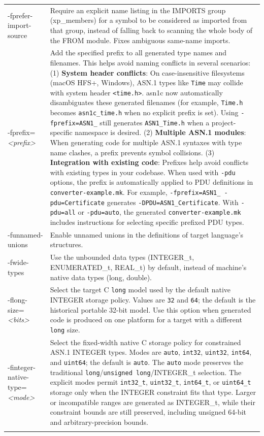 \documentclass[english,oneside,12pt]{book}
\begin{document}
\begin{longtable}{lp{4in}}
{\ttfamily -fprefer-import-source} & {\small Require an explicit name listing in the IMPORTS group (xp\_members) for a symbol to be
considered as imported from that group, instead of falling back to scanning the whole body of the FROM module. Fixes ambiguous same-name imports.}\\
{\ttfamily -fprefix=\emph{<prefix>}} & {\small Add the specified prefix to all generated type names and filenames. This helps avoid naming conflicts in several scenarios: (1) \textbf{System header conflicts}: On case-insensitive filesystems (macOS HFS+, Windows), ASN.1 types like \texttt{Time} may collide with system header \texttt{<time.h>}. asn1c now automatically disambiguates these generated filenames (for example, \texttt{Time.h} becomes \texttt{asn1c\_time.h} when no explicit prefix is set). Using \texttt{-fprefix=ASN1\_} still generates \texttt{ASN1\_Time.h} when a project-specific namespace is desired. (2) \textbf{Multiple ASN.1 modules}: When generating code for multiple ASN.1 syntaxes with type name clashes, a prefix prevents symbol collisions. (3) \textbf{Integration with existing code}: Prefixes help avoid conflicts with existing types in your codebase. When used with \texttt{-pdu} options, the prefix is automatically applied to PDU definitions in \texttt{converter-example.mk}. For example, \texttt{-fprefix=ASN1\_ -pdu=Certificate} generates \texttt{-DPDU=ASN1\_Certificate}. With \texttt{-pdu=all} or \texttt{-pdu=auto}, the generated \texttt{converter-example.mk} includes instructions for selecting specific prefixed PDU types.}\\
{\ttfamily -funnamed-unions} & {\small Enable  unnamed  unions in the definitions of target language's structures.}\\
{\ttfamily -fwide-types} & {\small Use the unbounded data types (INTEGER\_t, ENUMERATED\_t, REAL\_t) by default, instead of machine's native data types (long, double).}\\
{\ttfamily -flong-size=\emph{<bits>}} & {\small Select the target C \texttt{long} model used by the default native INTEGER storage policy. Values are \texttt{32} and \texttt{64}; the default is the historical portable 32-bit model. Use this option when generated code is produced on one platform for a target with a different \texttt{long} size.}\\
{\ttfamily -finteger-native-type=\emph{<mode>}} & {\small Select the fixed-width native C storage policy for constrained ASN.1 INTEGER types. Modes are \texttt{auto}, \texttt{int32}, \texttt{uint32}, \texttt{int64}, and \texttt{uint64}; the default is \texttt{auto}. The \texttt{auto} mode preserves the traditional \texttt{long}/\texttt{unsigned long}/INTEGER\_t selection. The explicit modes permit \texttt{int32\_t}, \texttt{uint32\_t}, \texttt{int64\_t}, or \texttt{uint64\_t} storage only when the INTEGER constraint fits that type. Larger or incompatible ranges are generated as INTEGER\_t, while their constraint bounds are still preserved, including unsigned 64-bit and arbitrary-precision bounds.}\\\\

\end{longtable}
\end{document}
